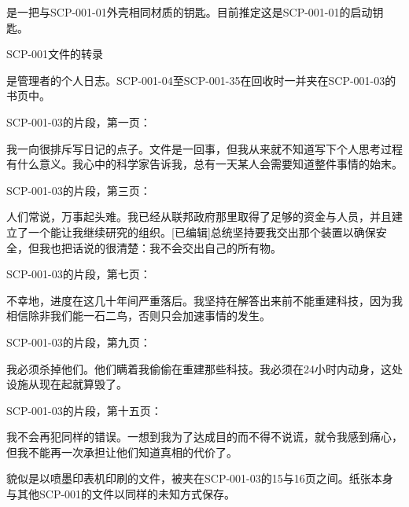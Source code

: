 是一把与SCP-001-01外壳相同材质的钥匙。目前推定这是SCP-001-01的启动钥匙。

SCP-001文件的转录

是管理者的个人日志。SCP-001-04至SCP-001-35在回收时一并夹在SCP-001-03的书页中。

SCP-001-03的片段，第一页：

\begin{scpbox}

我一向很排斥写日记的点子。文件是一回事，但我从来就不知道写下个人思考过程有什么意义。我心中的科学家告诉我，总有一天某人会需要知道整件事情的始末。

\end{scpbox}

SCP-001-03的片段，第三页：

\begin{scpbox}

人们常说，万事起头难。我已经从联邦政府那里取得了足够的资金与人员，并且建立了一个能让我继续研究的组织。{[}已编辑]总统坚持要我交出那个装置以确保安全，但我也把话说的很清楚：我不会交出自己的所有物。

\end{scpbox}

SCP-001-03的片段，第七页：

\begin{scpbox}

不幸地，进度在这几十年间严重落后。我坚持在解答出来前不能重建科技，因为我相信除非我们能一石二鸟，否则只会加速事情的发生。

\end{scpbox}

SCP-001-03的片段，第九页：

\begin{scpbox}

我必须杀掉他们。他们瞒着我偷偷在重建那些科技。我必须在24小时内动身，这处设施从现在起就算毁了。

\end{scpbox}

SCP-001-03的片段，第十五页：

\begin{scpbox}

我不会再犯同样的错误。一想到我为了达成目的而不得不说谎，就令我感到痛心，但我不能再一次承担让他们知道真相的代价了。

\end{scpbox}

貌似是以喷墨印表机印刷的文件，被夹在SCP-001-03的15与16页之间。纸张本身与其他SCP-001的文件以同样的未知方式保存。

